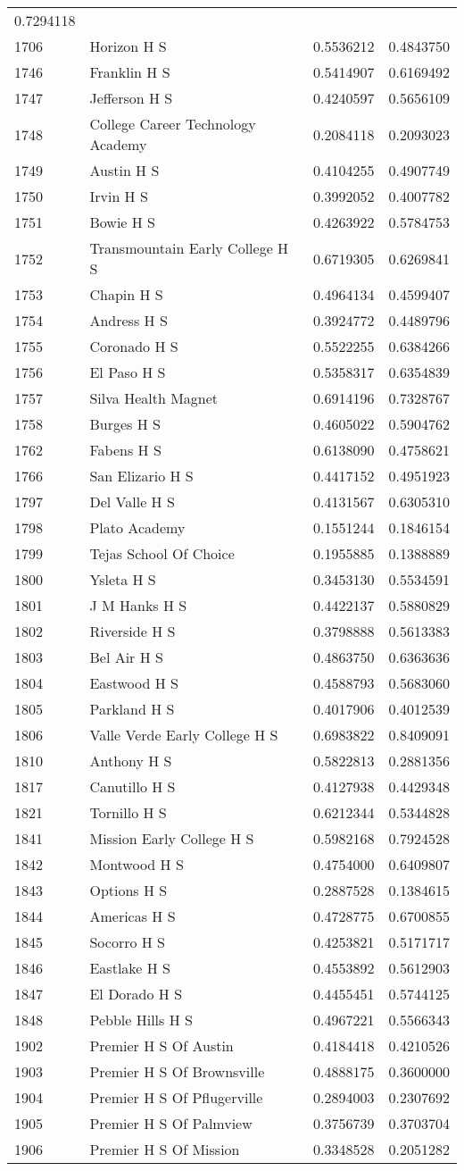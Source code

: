 \documentclass[
]{article}
\begin{document}
\begin{longtable}[]{@{}llrr@{}}
0.7294118\tabularnewline
1706 & Horizon H S & 0.5536212 & 0.4843750\tabularnewline
1746 & Franklin H S & 0.5414907 & 0.6169492\tabularnewline
1747 & Jefferson H S & 0.4240597 & 0.5656109\tabularnewline
1748 & College Career Technology Academy & 0.2084118 &
0.2093023\tabularnewline
1749 & Austin H S & 0.4104255 & 0.4907749\tabularnewline
1750 & Irvin H S & 0.3992052 & 0.4007782\tabularnewline
1751 & Bowie H S & 0.4263922 & 0.5784753\tabularnewline
1752 & Transmountain Early College H S & 0.6719305 &
0.6269841\tabularnewline
1753 & Chapin H S & 0.4964134 & 0.4599407\tabularnewline
1754 & Andress H S & 0.3924772 & 0.4489796\tabularnewline
1755 & Coronado H S & 0.5522255 & 0.6384266\tabularnewline
1756 & El Paso H S & 0.5358317 & 0.6354839\tabularnewline
1757 & Silva Health Magnet & 0.6914196 & 0.7328767\tabularnewline
1758 & Burges H S & 0.4605022 & 0.5904762\tabularnewline
1762 & Fabens H S & 0.6138090 & 0.4758621\tabularnewline
1766 & San Elizario H S & 0.4417152 & 0.4951923\tabularnewline
1797 & Del Valle H S & 0.4131567 & 0.6305310\tabularnewline
1798 & Plato Academy & 0.1551244 & 0.1846154\tabularnewline
1799 & Tejas School Of Choice & 0.1955885 & 0.1388889\tabularnewline
1800 & Ysleta H S & 0.3453130 & 0.5534591\tabularnewline
1801 & J M Hanks H S & 0.4422137 & 0.5880829\tabularnewline
1802 & Riverside H S & 0.3798888 & 0.5613383\tabularnewline
1803 & Bel Air H S & 0.4863750 & 0.6363636\tabularnewline
1804 & Eastwood H S & 0.4588793 & 0.5683060\tabularnewline
1805 & Parkland H S & 0.4017906 & 0.4012539\tabularnewline
1806 & Valle Verde Early College H S & 0.6983822 &
0.8409091\tabularnewline
1810 & Anthony H S & 0.5822813 & 0.2881356\tabularnewline
1817 & Canutillo H S & 0.4127938 & 0.4429348\tabularnewline
1821 & Tornillo H S & 0.6212344 & 0.5344828\tabularnewline
1841 & Mission Early College H S & 0.5982168 & 0.7924528\tabularnewline
1842 & Montwood H S & 0.4754000 & 0.6409807\tabularnewline
1843 & Options H S & 0.2887528 & 0.1384615\tabularnewline
1844 & Americas H S & 0.4728775 & 0.6700855\tabularnewline
1845 & Socorro H S & 0.4253821 & 0.5171717\tabularnewline
1846 & Eastlake H S & 0.4553892 & 0.5612903\tabularnewline
1847 & El Dorado H S & 0.4455451 & 0.5744125\tabularnewline
1848 & Pebble Hills H S & 0.4967221 & 0.5566343\tabularnewline
1902 & Premier H S Of Austin & 0.4184418 & 0.4210526\tabularnewline
1903 & Premier H S Of Brownsville & 0.4888175 & 0.3600000\tabularnewline
1904 & Premier H S Of Pflugerville & 0.2894003 &
0.2307692\tabularnewline
1905 & Premier H S Of Palmview & 0.3756739 & 0.3703704\tabularnewline
1906 & Premier H S Of Mission & 0.3348528 & 0.2051282\tabularnewline

\end{longtable}
\end{document}
